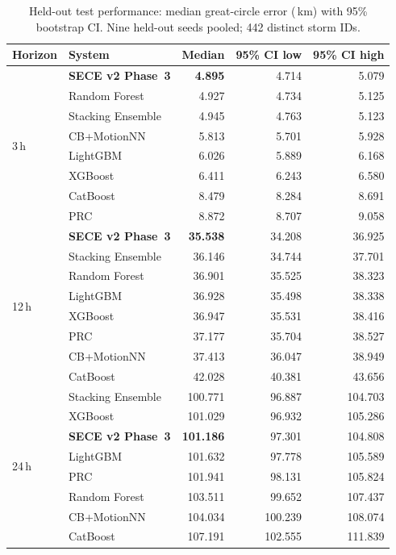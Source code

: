 \documentclass[11pt]{article}
\newcommand{\sece}{SECE}
\newcommand{\km}{\,km}
\begin{document}
\begin{table}[t]
\caption{Held-out test performance: median great-circle error (\km{}) with 95\% bootstrap CI. Nine held-out seeds pooled; 442 distinct storm IDs.}
\label{tab:heldout}
\centering
\small
\begin{tabular}{@{}llrrr@{}}
\toprule
Horizon & System & Median & 95\% CI low & 95\% CI high \\
\midrule
\multirow{8}{*}{3\,h}
  & \textbf{\sece{} v2 Phase~3} & \textbf{4.895} & 4.714 & 5.079 \\
  & Random Forest & 4.927 & 4.734 & 5.125 \\
  & Stacking Ensemble & 4.945 & 4.763 & 5.123 \\
  & CB+MotionNN & 5.813 & 5.701 & 5.928 \\
  & LightGBM & 6.026 & 5.889 & 6.168 \\
  & XGBoost & 6.411 & 6.243 & 6.580 \\
  & CatBoost & 8.479 & 8.284 & 8.691 \\
  & PRC & 8.872 & 8.707 & 9.058 \\
\midrule
\multirow{8}{*}{12\,h}
  & \textbf{\sece{} v2 Phase~3} & \textbf{35.538} & 34.208 & 36.925 \\
  & Stacking Ensemble & 36.146 & 34.744 & 37.701 \\
  & Random Forest & 36.901 & 35.525 & 38.323 \\
  & LightGBM & 36.928 & 35.498 & 38.338 \\
  & XGBoost & 36.947 & 35.531 & 38.416 \\
  & PRC & 37.177 & 35.704 & 38.527 \\
  & CB+MotionNN & 37.413 & 36.047 & 38.949 \\
  & CatBoost & 42.028 & 40.381 & 43.656 \\
\midrule
\multirow{8}{*}{24\,h}
  & Stacking Ensemble & 100.771 & 96.887 & 104.703 \\
  & XGBoost & 101.029 & 96.932 & 105.286 \\
  & \textbf{\sece{} v2 Phase~3} & \textbf{101.186} & 97.301 & 104.808 \\
  & LightGBM & 101.632 & 97.778 & 105.589 \\
  & PRC & 101.941 & 98.131 & 105.824 \\
  & Random Forest & 103.511 & 99.652 & 107.437 \\
  & CB+MotionNN & 104.034 & 100.239 & 108.074 \\
  & CatBoost & 107.191 & 102.555 & 111.839 \\

\end{tabular}
\end{table}
\end{document}
